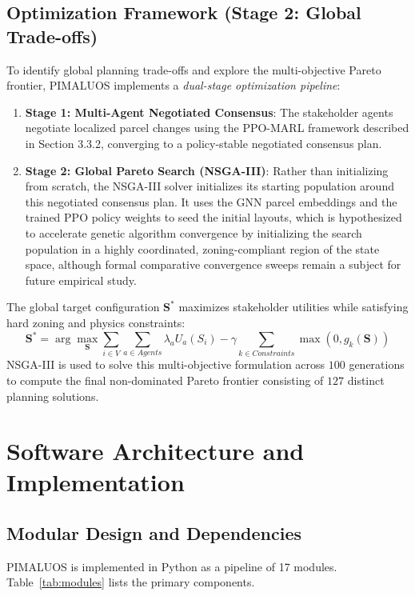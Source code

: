\documentclass[final,3p,times]{elsarticle}
\begin{document}
\subsection{Optimization Framework (Stage 2: Global Trade-offs)}
To identify global planning trade-offs and explore the multi-objective Pareto frontier, PIMALUOS implements a \textit{dual-stage optimization pipeline}:
\begin{enumerate}
    \item \textbf{Stage 1: Multi-Agent Negotiated Consensus}: The stakeholder agents negotiate localized parcel changes using the PPO-MARL framework described in Section 3.3.2, converging to a policy-stable negotiated consensus plan.
    \item \textbf{Stage 2: Global Pareto Search (NSGA-III)}: Rather than initializing from scratch, the NSGA-III solver initializes its starting population around this negotiated consensus plan. It uses the GNN parcel embeddings and the trained PPO policy weights to seed the initial layouts, which is hypothesized to accelerate genetic algorithm convergence by initializing the search population in a highly coordinated, zoning-compliant region of the state space, although formal comparative convergence sweeps remain a subject for future empirical study.
\end{enumerate}

The global target configuration $\mathbf{S}^*$ maximizes stakeholder utilities while satisfying hard zoning and physics constraints:
\begin{equation}
\mathbf{S}^* = \arg\max_{\mathbf{S}} \sum_{i \in V} \sum_{a \in Agents} \lambda_a U_{a}(S_i) - \gamma \sum_{k \in Constraints} \max(0, g_k(\mathbf{S}))
\end{equation}
NSGA-III is used to solve this multi-objective formulation across $100$ generations to compute the final non-dominated Pareto frontier consisting of $127$ distinct planning solutions.

\section{Software Architecture and Implementation}

\subsection{Modular Design and Dependencies}
PIMALUOS is implemented in Python as a pipeline of 17 modules. Table~\ref{tab:modules} lists the primary components.
\end{document}
